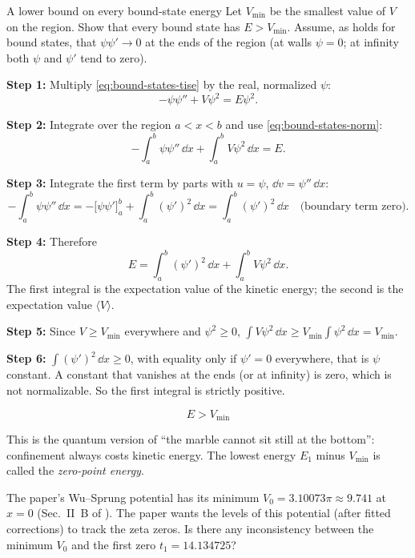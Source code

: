 \begin{sample}{A lower bound on every bound-state energy}
Let $V_{\min}$ be the smallest value of $V$ on the region. Show that every bound state has $E>V_{\min}$. Assume, as holds for bound states, that $\psi\psi'\to 0$ at the ends of the region (at walls $\psi=0$; at infinity both $\psi$ and $\psi'$ tend to zero).

\textbf{Step 1:} Multiply \cref{eq:bound-states-tise} by the real, normalized $\psi$:
\[ -\psi\psi''+V\psi^2=E\psi^2. \]

\textbf{Step 2:} Integrate over the region $a<x<b$ and use \cref{eq:bound-states-norm}:
\[ -\int_a^b\psi\psi''\,\dd x+\int_a^b V\psi^2\,\dd x=E. \]

\textbf{Step 3:} Integrate the first term by parts with $u=\psi$, $\dd v=\psi''\,\dd x$:
\[ -\int_a^b\psi\psi''\,\dd x=-\bigl[\psi\psi'\bigr]_a^b+\int_a^b(\psi')^2\,\dd x=\int_a^b(\psi')^2\,\dd x \quad\text{(boundary term zero)}. \]

\textbf{Step 4:} Therefore
\begin{equation}
E=\int_a^b(\psi')^2\,\dd x+\int_a^b V\psi^2\,\dd x .
\label{eq:bound-states-energy-split}
\end{equation}
The first integral is the expectation value of the kinetic energy; the second is the expectation value $\langle V\rangle$.

\textbf{Step 5:} Since $V\ge V_{\min}$ everywhere and $\psi^2\ge0$, $\int V\psi^2\,\dd x\ge V_{\min}\int\psi^2\,\dd x=V_{\min}$.

\textbf{Step 6:} $\int(\psi')^2\,\dd x\ge 0$, with equality only if $\psi'=0$ everywhere, that is $\psi$ constant. A constant that vanishes at the ends (or at infinity) is zero, which is not normalizable. So the first integral is strictly positive.

\[ \boxed{E>V_{\min}} \]
\end{sample}

This is the quantum version of ``the marble cannot sit still at the bottom'': confinement always costs kinetic energy. The lowest energy $E_1$ minus $V_{\min}$ is called the \emph{zero-point energy}.

\begin{checkpoint}
The paper's Wu--Sprung potential has its minimum $V_0=3.10073\pi\approx 9.741$ at $x=0$ (Sec.~II~B of \cite{soniR1}). The paper wants the levels of this potential (after fitted corrections) to track the zeta zeros. Is there any inconsistency between the minimum $V_0$ and the first zero $t_1=14.134725$?
\end{checkpoint}

